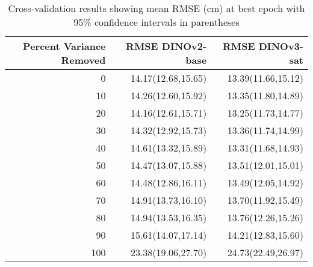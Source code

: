 \begin{table}
\caption{Cross-validation results showing mean RMSE (cm) at best epoch with 95\% confidence intervals in parentheses}
\label{tab:cv_results}
\begin{tabular}{rrr}
\toprule
Percent Variance Removed & RMSE DINOv2-base & RMSE DINOv3-sat \\
\midrule
0 & 14.17(12.68,15.65) & 13.39(11.66,15.12) \\
10 & 14.26(12.60,15.92) & 13.35(11.80,14.89) \\
20 & 14.16(12.61,15.71) & 13.25(11.73,14.77) \\
30 & 14.32(12.92,15.73) & 13.36(11.74,14.99) \\
40 & 14.61(13.32,15.89) & 13.31(11.68,14.93) \\
50 & 14.47(13.07,15.88) & 13.51(12.01,15.01) \\
60 & 14.48(12.86,16.11) & 13.49(12.05,14.92) \\
70 & 14.91(13.73,16.10) & 13.70(11.92,15.49) \\
80 & 14.94(13.53,16.35) & 13.76(12.26,15.26) \\
90 & 15.61(14.07,17.14) & 14.21(12.83,15.60) \\
100 & 23.38(19.06,27.70) & 24.73(22.49,26.97) \\
\bottomrule
\end{tabular}
\end{table}
